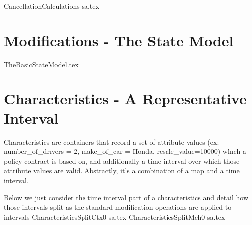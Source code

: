 {CancellationCalculations-sa.tex}

\section{Modifications - The State Model}
\label{sec:03:5}
{TheBasicStateModel.tex}

\section{Characteristics - A Representative Interval}
\label{sec:03:6}

Characteristics are containers that record a set of attribute values
(ex: number\_of\_drivers = 2, make\_of\_car = Honda, resale\_value=10000)
which a policy contract is based on, and additionally a time interval over which
those attribute values are valid. Abstractly, it's a combination of a map and a time
interval. 

Below we just consider the time interval part of a characteristics and detail
how those intervals split as the standard modification operations are applied
to intervals
{CharacteristicsSplitCtx0-sa.tex}
{CharacteristicsSplitMch0-sa.tex}
